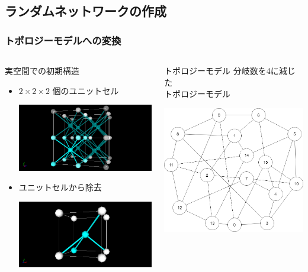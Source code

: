 \documentclass[aspectratio=169,11pt, dvipdfmx]{beamer}
\begin{document}
\subsection{ランダムネットワークの作成}
\begin{frame}
	\frametitle{トポロジーモデルへの変換}
		\begin{columns}[totalwidth=\textwidth]
				\begin{block}{実空間での初期構造}
					\begin{itemize}
						\item $2\times2\times2$ 個のユニットセル
			
							\includegraphics[width=0.7\columnwidth]{8_per.png}

						\item ユニットセルから除去

							\includegraphics[width=0.7\columnwidth]{8_4.png}

					\end{itemize}
				\end{block}
			\begin{exampleblock}{トポロジーモデル}
				分岐数を4に減じた\\トポロジーモデル

				\includegraphics[width=.8\columnwidth]{Network.png}


\end{exampleblock}
\end{columns}
\end{frame}
\end{document}
